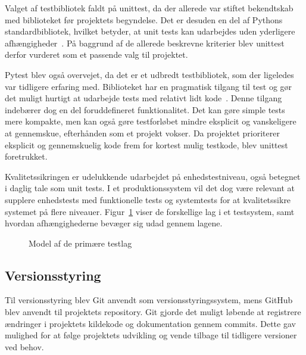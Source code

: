 \documentclass[a4paper, 11pt]{article}
\begin{document}
Valget af testbibliotek faldt på unittest, da der allerede var stiftet bekendtskab med
biblioteket før projektets begyndelse. Det er desuden en del af Pythons standardbibliotek,
hvilket betyder, at unit tests kan udarbejdes uden yderligere
afhængigheder~\cite{unittest}. På baggrund af de allerede beskrevne kriterier blev
unittest derfor vurderet som et passende valg til projektet.

Pytest blev også overvejet, da det er et udbredt testbibliotek, som der ligeledes var
tidligere erfaring med. Biblioteket har en pragmatisk tilgang til test og gør det muligt
hurtigt at udarbejde tests med relativt lidt kode~\cite{pytest}. Denne tilgang indebærer
dog en del foruddefineret funktionalitet. Det kan gøre simple tests mere kompakte, men
kan også gøre testforløbet mindre eksplicit og vanskeligere at gennemskue, efterhånden
som et projekt vokser. Da projektet prioriterer eksplicit og gennemskuelig kode frem for
kortest mulig testkode, blev unittest foretrukket.

Kvalitetssikringen er udelukkende udarbejdet på enhedstestniveau, også betegnet i daglig tale
som unit tests. I et produktionssystem vil det dog være relevant at supplere enhedstests med
funktionelle tests og systemtests for at kvalitetssikre systemet på flere niveauer.
Figur~\ref{fig:test_layers} viser de forskellige lag i et testsystem, samt hvordan
afhængighederne bevæger sig udad gennem lagene.

\begin{figure}[ht]
  \centering
  \caption{Model af de primære testlag}
  \label{fig:test_layers}
\end{figure}

\subsection{Versionsstyring}

Til versionsstyring blev Git anvendt som versionsstyringssystem, mens GitHub blev
anvendt til projektets repository. Git gjorde det muligt løbende at
registrere ændringer i projektets kildekode og dokumentation gennem commits. Dette gav
mulighed for at følge projektets udvikling og vende tilbage til tidligere versioner ved
behov.
\end{document}
